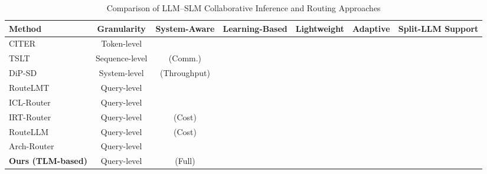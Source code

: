 \documentclass[lettersize,journal]{IEEEtran}
\newcommand{\cmark}{\ding{51}} %
\newcommand{\xmark}{\ding{55}} %
\begin{document}
\begin{table}[t]
\centering
\caption{Comparison of LLM--SLM Collaborative Inference and Routing Approaches}
\label{tab:comparison}
\begin{tabular}{lcccccc}
\hline
\textbf{Method} & \textbf{Granularity} & \textbf{System-Aware} & \textbf{Learning-Based} & \textbf{Lightweight} & \textbf{Adaptive} & \textbf{Split-LLM Support} \\
\hline
CITER~\cite{WZheng2025} & Token-level & \xmark & \cmark & \xmark & \xmark & \xmark \\
TSLT~\cite{CZheng2026} & Sequence-level & \cmark (Comm.) & \xmark & \xmark & \xmark & \xmark \\
DiP-SD~\cite{Xu2026} & System-level & \cmark (Throughput) & \xmark & \xmark & \xmark & \xmark \\
RouteLMT~\cite{Luo2026} & Query-level & \xmark & \cmark & \cmark & \cmark & \xmark \\
ICL-Router~\cite{Wang2026} & Query-level & \xmark & \cmark & \xmark & \cmark & \xmark \\
IRT-Router~\cite{Song2025} & Query-level & \cmark (Cost) & \cmark & \xmark & \cmark & \xmark \\
RouteLLM~\cite{Ong2025} & Query-level & \cmark (Cost) & \cmark & \xmark & \cmark & \xmark \\
Arch-Router~\cite{Tran2025} & Query-level & \xmark & \cmark & \cmark & \cmark & \xmark \\
\hline
\textbf{Ours (TLM-based)} & Query-level & \cmark (Full) & \cmark & \cmark & \cmark & \cmark \\
\hline
\end{tabular}
\end{table}
\end{document}

